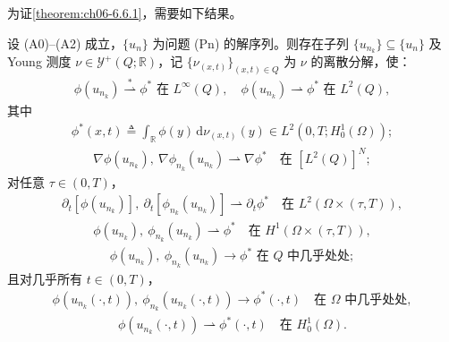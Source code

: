\documentclass[../../main.tex]{subfiles}%
\begin{document}
为证\cref{theorem:ch06-6.6.1}，需要如下结果。

\begin{proposition}\label{proposition:ch06-6.6.2}
设 (A0)--(A2) 成立，$\{u_n\}$ 为问题 (Pn) 的解序列。则存在子列 $\{u_{n_k}\}\subseteq\{u_n\}$ 及 Young 测度 $\nu\in\mathcal{Y}^+(Q;\mathbb{R})$，记 $\{\nu_{(x,t)}\}_{(x,t)\in Q}$ 为 $\nu$ 的离散分解，使：
\begin{align}
\phi(u_{n_k})\stackrel{*}{\rightharpoonup}\phi^* \text{ 在 }L^\infty(Q),\quad
\phi(u_{n_k})\rightharpoonup\phi^* \text{ 在 }L^2(Q), \label{align:ch6-6.82}
\end{align}
其中
\begin{align}
\phi^*(x,t)\triangleq \int_\mathbb{R}\phi(y)\,\mathrm{d}\nu_{(x,t)}(y)\in L^2(0,T;H^1_0(\Omega)); \label{align:ch6-6.83}
\end{align}
\begin{align}
\nabla\phi(u_{n_k}),\ \nabla\phi_{n_k}(u_{n_k})\rightharpoonup\nabla\phi^* \quad\text{在 }[L^2(Q)]^N; \label{align:ch6-6.84}
\end{align}
对任意 $\tau\in(0,T)$，
\begin{align}
\partial_t[\phi(u_{n_k})],\ \partial_t[\phi_{n_k}(u_{n_k})]\rightharpoonup\partial_t\phi^*
\quad\text{在 }L^2(\Omega\times(\tau,T)), \label{align:ch6-6.85}
\end{align}
\begin{align}
\phi(u_{n_k}),\ \phi_{n_k}(u_{n_k})\rightharpoonup\phi^* \quad\text{在 }H^1(\Omega\times(\tau,T)), \label{align:ch6-6.86}
\end{align}
\begin{align}
\phi(u_{n_k}),\ \phi_{n_k}(u_{n_k})\to\phi^* \text{ 在 }Q\text{ 中几乎处处}; \label{align:ch6-6.87}
\end{align}
且对几乎所有 $t\in(0,T)$，
\begin{align}
\phi(u_{n_k}(\cdot,t)),\ \phi_{n_k}(u_{n_k}(\cdot,t))\to\phi^*(\cdot,t)
\quad\text{在 }\Omega\text{ 中几乎处处}, \label{align:ch6-6.88}
\end{align}
\begin{align}
\phi(u_{n_k}(\cdot,t))\rightharpoonup\phi^*(\cdot,t) \quad\text{在 }H^1_0(\Omega). \label{align:ch6-6.89}
\end{align}
\end{proposition}
\end{document}
